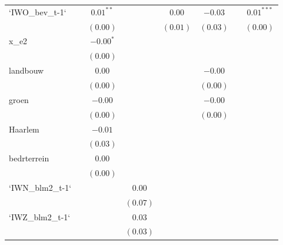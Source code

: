\begin{center}
\begin{longtable}{l c c c c c c c }
`IWO\_bev\_t-1`  &               & $0.01^{**}$ &              & $0.00$        & $-0.03$       &               & $0.01^{***}$  \\
                 &               & $(0.00)$    &              & $(0.01)$      & $(0.03)$      &               & $(0.00)$      \\
x\_e2            &               & $-0.00^{*}$ &              &               &               &               &               \\
                 &               & $(0.00)$    &              &               &               &               &               \\
landbouw         &               & $0.00$      &              &               & $-0.00$       &               &               \\
                 &               & $(0.00)$    &              &               & $(0.00)$      &               &               \\
groen            &               & $-0.00$     &              &               & $-0.00$       &               &               \\
                 &               & $(0.00)$    &              &               & $(0.00)$      &               &               \\
Haarlem          &               & $-0.01$     &              &               &               &               &               \\
                 &               & $(0.03)$    &              &               &               &               &               \\
bedrterrein      &               & $0.00$      &              &               &               &               &               \\
                 &               & $(0.00)$    &              &               &               &               &               \\
`IWN\_blm2\_t-1` &               &             & $0.00$       &               &               &               &               \\
                 &               &             & $(0.07)$     &               &               &               &               \\
`IWZ\_blm2\_t-1` &               &             & $0.03$       &               &               &               &               \\
                 &               &             & $(0.03)$     &               &               &               &               \\

\end{longtable}
\end{center}
